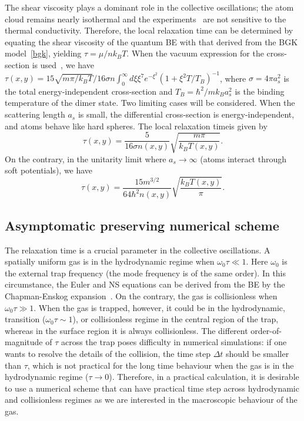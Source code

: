 The shear viscosity plays a dominant role in the collective oscillations; the atom cloud remains nearly isothermal and the experiments~\cite{Kavoulakis1998,Braby2010} are not sensitive to the thermal conductivity. Therefore, the local relaxation time can be determined by equating the shear viscosity of the quantum BE with that derived from the BGK model~\eqref{bgk}, yielding $\tau=\mu/nk_BT$. When the vacuum expression for the cross-section is used~\cite{Massignan2005}, we have $\tau(x,y)={15}\sqrt{{m\pi}/{k_BT}}/{16\sigma n\int_0^\infty d\xi\xi^7e^{-\xi^2}(1+\xi^2T/T_B)^{-1}}$, where $\sigma=4\pi a_s^2$ is the total energy-independent cross-section and $T_B=\hbar^2/mk_Ba_s^2$ is the binding temperature of the dimer state. Two limiting cases will be considered. When the scattering length $a_s$ is small, the differential cross-section is energy-independent, and atoms behave like hard spheres. The local relaxation timeis  given by~\cite{Massignan2005,Nikuni1998,Watabe2010}
\begin{equation}\label{nu}
    \tau(x,y)=\frac{5}{16\sigma n(x,y)}\sqrt{\frac{m\pi}{k_BT(x,y)}}.
\end{equation}
On the contrary, in the unitarity limit where
$a_s\rightarrow\infty$ (atoms interact through soft potentials), we have
\begin{equation}\label{nu2}
\tau(x,y)=\frac{15m^{3/2}}{64\hbar^2n(x,y)}\sqrt{\frac{k_BT(x,y)}{\pi}}.
\end{equation}



\subsection{Asymptomatic preserving numerical scheme}

The relaxation time is a crucial parameter in the collective oscillations. A spatially uniform gas is in the hydrodynamic regime when $\omega_0\tau\ll1$. Here $\omega_0$ is the external trap frequency (the mode frequency is of the same order). In this circumstance, the Euler and NS equations can be derived
from the BE by the Chapman-Enskog expansion~\cite{Nikuni1998}. On the contrary, the gas is collisionless when $\omega_0\tau\gg1$. When the gas is trapped, however, it could be in the hydrodynamic, transition ($\omega_0\tau\sim1$), or collisionless regime in the central region of the trap, whereas in the surface region it is always collisionless. The different order-of-magnitude of $\tau$ across the trap poses difficulty in numerical simulations: if one wants to resolve the details of the collision, the time step $\Delta{t}$ should be smaller than $\tau$, which is not practical for the long time behaviour when the gas is in the hydrodynamic regime ($\tau\rightarrow0$). Therefore, in a practical calculation, it is desirable to use a numerical scheme that can have practical time step across hydrodynamic and collisionless regimes as we are interested in the macroscopic behaviour of the gas.





